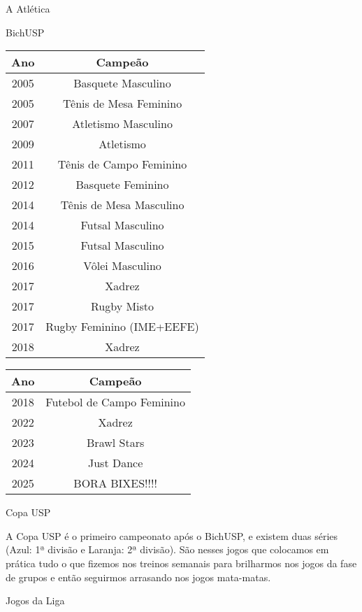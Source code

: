 \begin{secao}{A Atlética}
\begin{subsecao}{BichUSP}
\begin{center}
  \begin{tabular}{|c|c|}
    \hline
    Ano & Campeão\\
    \hline
    2005 & Basquete Masculino \\
    2005 & Tênis de Mesa Feminino \\
    2007 & Atletismo Masculino\\
    2009 & Atletismo\\
    2011 & Tênis de Campo Feminino\\
    2012 & Basquete Feminino\\
    2014 & Tênis de Mesa Masculino\\
    2014 & Futsal Masculino\\
    2015 & Futsal Masculino\\
    2016 & Vôlei Masculino\\
    2017 & Xadrez\\
    2017 & Rugby Misto\\
    2017 & Rugby Feminino (IME+EEFE)\\
    2018 & Xadrez\\
     \hline
  \end{tabular}
\end{center}
\begin{center}
  \begin{tabular}{|c|c|}
    \hline
    Ano & Campeão\\
    \hline
    2018 & Futebol de Campo Feminino\\
    2022 & Xadrez\\
    2023 & Brawl Stars\\
    2024 & Just Dance\\
    2025 & BORA BIXES!!!!\\
    \hline
  \end{tabular}
\end{center}

\end{subsecao}
\begin{subsecao}{Copa USP}

A Copa USP é o primeiro campeonato após o BichUSP, e existem duas séries (Azul:
1ª divisão e Laranja: 2ª divisão). São nesses jogos que colocamos em prática
tudo o que fizemos nos treinos semanais para brilharmos nos jogos da fase de
grupos e então seguirmos arrasando nos jogos mata-matas.

\end{subsecao}
\begin{subsecao}{Jogos da Liga}


\end{subsecao}
\end{secao}
